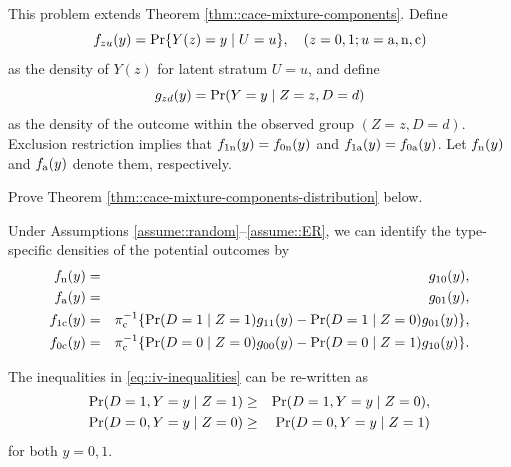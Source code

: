 \begin{HomeworkProblem}\label{exr:22-3}


This problem extends Theorem \ref{thm::cace-mixture-components}. Define
\[
f_{zu}(y) = \operatorname{Pr}\{  Y(z) = y  \mid U=u \},  \quad  (z=0,1;u=\textup{a}, \textup{n}, \textup{c})
\]
as the density of $Y(z)$ for latent stratum $U=u$, and define
\[
g_{zd}(y) = \operatorname{Pr}(Y = y\mid Z=z, D=d)
\]
as the density of the outcome within the observed group $(Z=z, D=d)$.
Exclusion restriction implies that $f_{1\textup{n}}(y) = f_{0\textup{n}} (y) $ and $f_{1\textup{a}}(y) = f_{0\textup{a}}(y) $. Let $f_{\textup{n}}(y)$ and $ f_{\textup{a}} (y) $ denote them, respectively.



Prove  Theorem \ref{thm::cace-mixture-components-distribution} below.



\begin{Theorem}
\label{thm::cace-mixture-components-distribution}
Under Assumptions \ref{assume::random}--\ref{assume::ER}, we can identify the type-specific densities of the potential outcomes by
\begin{eqnarray*}
  f_{\textup{n}}(y) &=& g_{10}(y) ,\\
  f_{\textup{a}} (y) &=& g_{01}(y),\\
f_{1\textup{c}}(y) &=& \pi_{\textup{c}}^{-1} \{   \operatorname{Pr}(D=1\mid Z=1 )g_{11}(y)  -  \operatorname{Pr}(D=1\mid Z=0) g_{01}(y)   \} , \\
f_{0\textup{c}} (y) &=& \pi_{\textup{c}}^{-1} \{  \operatorname{Pr}(D=0\mid Z=0)  g_{00}(y)  -  \operatorname{Pr}(D=0\mid Z=1)  g_{10}(y)    \} .
\end{eqnarray*}
\end{Theorem}









\end{HomeworkProblem}

\begin{HomeworkProblem}\label{exr:22-4}

The inequalities in \eqref{eq::iv-inequalities} can be re-written as
\begin{eqnarray*}
\operatorname{Pr}(D=1, Y=y\mid Z=1) &\geq & \operatorname{Pr}(D=1, Y=y\mid Z=0), \\
\operatorname{Pr}(D=0, Y=y\mid Z=0) &\geq & \operatorname{Pr}(D=0, Y=y\mid Z=1)
\end{eqnarray*}
for both $y=0,1$.



\end{HomeworkProblem}

